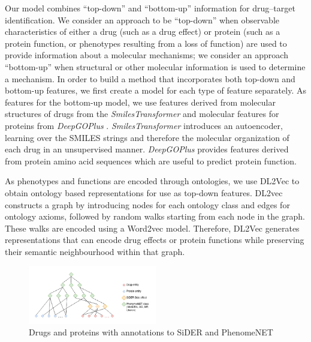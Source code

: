 \documentclass{bioinfo}
\begin{document}
Our model combines ``top-down'' and ``bottom-up'' information for
drug--target identification. We consider an approach to be
``top-down'' when observable characteristics of either a drug (such as
a drug effect) or protein (such as a protein function, or phenotypes
resulting from a loss of function) are used to provide information
about a molecular mechanisms; we consider an approach ``bottom-up''
when structural or other molecular information is used to determine a
mechanism.  In order to build a method that incorporates both top-down
and bottom-up features, we first create a model for each type of
feature separately.  As features for the bottom-up model, we use
features derived from molecular structures of drugs from the
\textit{SmilesTransformer} \citep{SmilesTransformer} and molecular
features for proteins from \textit{DeepGOPlus}
\citep{DeepGoPlus}. \textit{SmilesTransformer} introduces an
autoencoder, learning over the SMILES strings and therefore the
molecular organization of each drug in an unsupervised manner. 
\textit{DeepGOPlus} provides features derived from protein amino acid
sequences which are useful to predict protein function.

As phenotypes and functions are encoded through ontologies, we use
DL2Vec \citep{DL2vec2020} to obtain ontology based representations for
use as top-down features. DL2vec constructs a graph by introducing
nodes for each ontology class and edges for ontology axioms, followed
by random walks starting from each node in the graph. These walks are
encoded using a Word2vec \citep{Word2vec2013} model. Therefore, DL2Vec
generates representations that can encode drug effects or protein
functions while preserving their semantic neighbourhood within that
graph.


\begin{figure}[!tpb]%
	\centerline{\includegraphics[width=0.5\textwidth]{figures/drug_protein_ontology_network.png}}
	\caption{Drugs and proteins with annotations to SiDER and PhenomeNET}
	\label{fig:Onto}
\end{figure}
\end{document}
